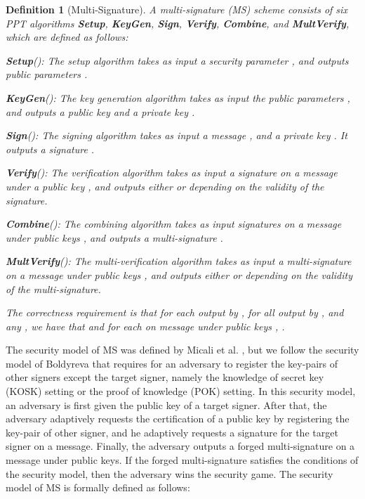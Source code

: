 \documentclass[11pt,letterpaper]{article}
\newtheorem{definition}[theorem]{Definition}
\newcommand{\tb}[1]{\textbf{#1}}
\begin{document}
\begin{definition}[Multi-Signature]
A multi-signature (MS) scheme consists of six PPT algorithms \tb{Setup},
\tb{KeyGen}, \tb{Sign}, \tb{Verify}, \tb{Combine}, and \tb{MultVerify}, which
are defined as follows:
\begin{description}
\item \tb{Setup}(): The setup algorithm takes as input a
    security parameter , and outputs public parameters .

\item \tb{KeyGen}(): The key generation algorithm takes as input the
    public parameters , and outputs a public key  and a private key
    .

\item \tb{Sign}(): The signing algorithm takes as input a message
    , and a private key . It outputs a signature .

\item \tb{Verify}(): The verification algorithm takes as
    input a signature  on a message  under a public key ,
    and outputs either  or  depending on the validity of the
    signature.

\item \tb{Combine}(): The combining algorithm
    takes as input signatures  on a message  under public
    keys , and outputs a multi-signature
    .

\item \tb{MultVerify}(): The multi-verification algorithm
    takes as input a multi-signature  on a message  under public
    keys , and outputs either  or 
    depending on the validity of the multi-signature.
\end{description}
The correctness requirement is that for each  output by
, for all  output by , and
any , we have that  and for
each  on message  under public keys ,
.
\end{definition}

The security model of MS was defined by Micali et al. \cite{MicaliOR01}, but
we follow the security model of Boldyreva \cite{Boldyreva03} that requires
for an adversary to register the key-pairs of other signers except the target
signer, namely the knowledge of secret key (KOSK) setting or the proof of
knowledge (POK) setting. In this security model, an adversary is first given
the public key of a target signer. After that, the adversary adaptively
requests the certification of a public key by registering the key-pair of
other signer, and he adaptively requests a signature for the target signer on
a message. Finally, the adversary outputs a forged multi-signature on a
message  under public keys. If the forged multi-signature satisfies the
conditions of the security model, then the adversary wins the security game.
The security model of MS is formally defined as follows:
\end{document}
